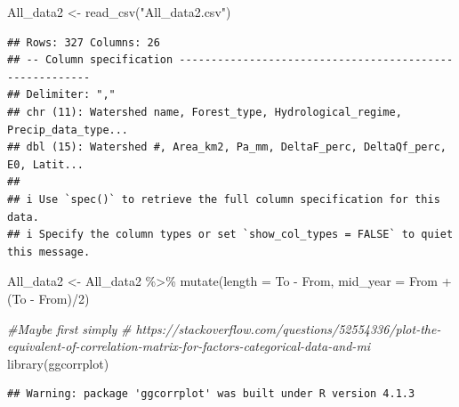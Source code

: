 \documentclass[]{elsarticle} %
\newenvironment{Shaded}{\begin{snugshade}}{\end{snugshade}}
\newcommand{\AttributeTok}[1]{\textcolor[rgb]{0.77,0.63,0.00}{#1}}
\newcommand{\CommentTok}[1]{\textcolor[rgb]{0.56,0.35,0.01}{\textit{#1}}}
\newcommand{\DecValTok}[1]{\textcolor[rgb]{0.00,0.00,0.81}{#1}}
\newcommand{\FunctionTok}[1]{\textcolor[rgb]{0.00,0.00,0.00}{#1}}
\newcommand{\NormalTok}[1]{#1}
\newcommand{\OtherTok}[1]{\textcolor[rgb]{0.56,0.35,0.01}{#1}}
\newcommand{\SpecialCharTok}[1]{\textcolor[rgb]{0.00,0.00,0.00}{#1}}
\newcommand{\StringTok}[1]{\textcolor[rgb]{0.31,0.60,0.02}{#1}}
\begin{document}
\begin{Shaded}
\begin{Highlighting}[]
\NormalTok{All\_data2 }\OtherTok{\textless{}{-}} \FunctionTok{read\_csv}\NormalTok{(}\StringTok{"All\_data2.csv"}\NormalTok{)}
\end{Highlighting}
\end{Shaded}

\begin{verbatim}
## Rows: 327 Columns: 26
## -- Column specification --------------------------------------------------------
## Delimiter: ","
## chr (11): Watershed name, Forest_type, Hydrological_regime, Precip_data_type...
## dbl (15): Watershed #, Area_km2, Pa_mm, DeltaF_perc, DeltaQf_perc, E0, Latit...
## 
## i Use `spec()` to retrieve the full column specification for this data.
## i Specify the column types or set `show_col_types = FALSE` to quiet this message.
\end{verbatim}

\begin{Shaded}
\begin{Highlighting}[]
\NormalTok{All\_data2 }\OtherTok{\textless{}{-}}\NormalTok{ All\_data2 }\SpecialCharTok{\%\textgreater{}\%}
  \FunctionTok{mutate}\NormalTok{(}\AttributeTok{length =}\NormalTok{ To }\SpecialCharTok{{-}}\NormalTok{ From,}
         \AttributeTok{mid\_year =}\NormalTok{ From }\SpecialCharTok{+}\NormalTok{ (To }\SpecialCharTok{{-}}\NormalTok{ From)}\SpecialCharTok{/}\DecValTok{2}\NormalTok{)}

\CommentTok{\#Maybe first simply}
\CommentTok{\# https://stackoverflow.com/questions/52554336/plot{-}the{-}equivalent{-}of{-}correlation{-}matrix{-}for{-}factors{-}categorical{-}data{-}and{-}mi}
\FunctionTok{library}\NormalTok{(ggcorrplot)}
\end{Highlighting}
\end{Shaded}

\begin{verbatim}
## Warning: package 'ggcorrplot' was built under R version 4.1.3
\end{verbatim}
\end{document}
